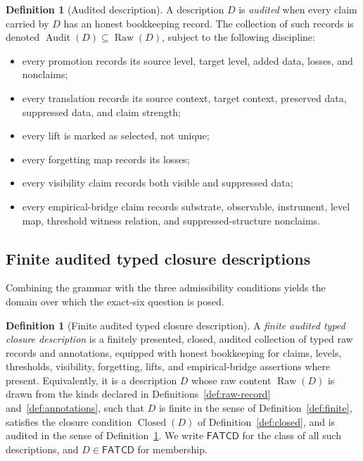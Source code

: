 \documentclass[11pt]{article}
\theoremstyle{definition}
\newtheorem{definition}[theorem]{Definition}
\newcommand{\FATCD}{\ensuremath{\mathsf{FATCD}}}
\newcommand{\Raw}[1]{\ensuremath{\operatorname{Raw}\!\left(#1\right)}}
\newcommand{\Audit}[1]{\ensuremath{\operatorname{Audit}\!\left(#1\right)}}
\newcommand{\Closed}[1]{\ensuremath{\operatorname{Closed}\!\left(#1\right)}}
\begin{document}
\begin{definition}[Audited description]\label{def:audited}
A description \(D\) is \emph{audited} when every claim carried by \(D\) has an
honest bookkeeping record. The collection of such records is denoted
\(\Audit{D} \subseteq \Raw{D}\), subject to the following discipline:
\begin{itemize}[topsep=2pt,itemsep=1pt]
  \item every promotion records its source level, target level, added data,
    losses, and nonclaims;
  \item every translation records its source context, target context,
    preserved data, suppressed data, and claim strength;
  \item every lift is marked as selected, not unique;
  \item every forgetting map records its losses;
  \item every visibility claim records both visible and suppressed data;
  \item every empirical-bridge claim records substrate, observable,
    instrument, level map, threshold witness relation, and
    suppressed-structure nonclaims.
\end{itemize}
\end{definition}

\subsection{Finite audited typed closure descriptions}\label{subsec:fatcd}

Combining the grammar with the three admissibility conditions yields
the domain over which the exact-six question is posed.

\begin{definition}[Finite audited typed closure description]\label{def:fatcd}
A \emph{finite audited typed closure description} is a finitely presented,
closed, audited collection of typed raw records and annotations, equipped with
honest bookkeeping for claims, levels, thresholds, visibility, forgetting,
lifts, and empirical-bridge assertions where present. Equivalently, it is a
description \(D\) whose raw content \(\Raw{D}\) is drawn from the kinds
declared in Definitions~\ref{def:raw-record} and~\ref{def:annotations}, such
that \(D\) is finite in the sense of Definition~\ref{def:finite}, satisfies
the closure condition \(\Closed{D}\) of Definition~\ref{def:closed}, and is
audited in the sense of Definition~\ref{def:audited}. We write \FATCD{} for
the class of all such descriptions, and \(D \in \FATCD{}\) for membership.
\end{definition}
\end{document}
